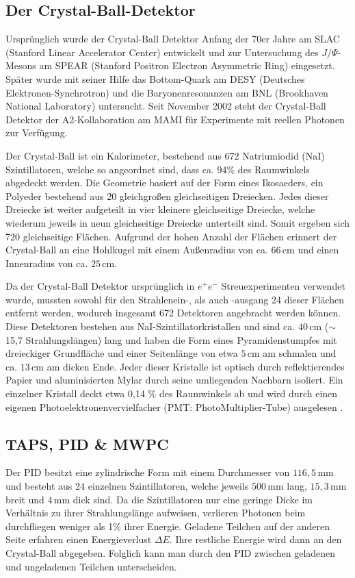 \documentclass[a4paper,11pt,oneside,final,german,openbib,pdftex]{scrbook}
\begin{document}
{\subsection{Der Crystal-Ball-Detektor}
Ursprünglich wurde der Crystal-Ball Detektor Anfang der 70er Jahre am SLAC (Stanford Linear Accelerator Center) entwickelt und zur Untersuchung des $J/\Psi$-Mesons am SPEAR (Stanford Positron Electron Asymmetric Ring) eingesetzt. Später wurde mit seiner Hilfe das Bottom-Quark am DESY (Deutsches Elektronen-Synchrotron) und die Baryonenresonanzen am BNL (Brookhaven National Laboratory) untersucht.
Seit November 2002 steht der Crystal-Ball Detektor der A2-Kollaboration am MAMI für Experimente mit reellen Photonen zur Verfügung.
\newline

Der Crystal-Ball ist ein Kalorimeter, bestehend aus 672 Natriumiodid (NaI) Szintillatoren, welche so angeordnet sind, dass ca. 94\% des Raumwinkels abgedeckt werden. Die Geometrie basiert auf der Form eines Ikosaeders, ein Polyeder bestehend aus 20 gleichgro{\ss}en gleichseitigen Dreiecken. Jedes dieser Dreiecke ist weiter aufgeteilt in vier kleinere gleichseitige Dreiecke, welche wiederum jeweils in neun gleichseitige Dreiecke unterteilt sind. Somit ergeben sich 720 gleichseitige Fl\"achen. Aufgrund der hohen Anzahl der Fl\"achen erinnert der Crystal-Ball an eine Hohlkugel mit einem Au{\ss}enradius von ca. $66\,\text{cm}$ und einen Innenradius von ca. $25\,\text{cm}$. 

Da der Crystal-Ball Detektor urspr\"unglich in $e^+e^-$ Streuexperimenten verwendet wurde, mussten sowohl f\"ur den Strahlenein-, als auch -ausgang 24 dieser Fl\"achen entfernt werden, wodurch insgesamt 672 Detektoren angebracht werden k\"onnen. Diese Detektoren bestehen aus NaI-Szintillatorkristallen und sind ca. $40\,\text{cm}$ ($\sim$15,7 Strahlungsl\"angen) lang und haben die Form eines Pyramidenstumpfes mit dreieckiger Grundfl\"ache und einer Seitenl\"ange von etwa $5\,\text{cm}$ am schmalen und ca. $13\,\text{cm}$ am dicken Ende. Jeder dieser Kristalle ist optisch durch reflektierendes Papier und aluminisierten Mylar durch seine umliegenden Nachbarn isoliert. Ein einzelner Kristall deckt etwa 0,14 \% des Raumwinkels ab und wird durch einen eigenen Photoelektronenvervielfacher (PMT: PhotoMultiplier-Tube) ausgelesen \cite{We13}. 



\subsection{TAPS, PID \& MWPC}
\label{sec:TAPS-PID-MWPC}
Der PID besitzt eine zylindrische Form mit einem Durchmesser von $116,5\,\text{mm}$ und besteht aus 24 einzelnen Szintillatoren, welche jeweils $500 \,\text{mm}$ lang, $15,3\,\text{mm}$ breit und $4 \,\text{mm}$ dick sind. Da die Szintillatoren nur eine geringe Dicke im Verhältnis zu ihrer Strahlungslänge aufweisen, verlieren Photonen beim durchfliegen weniger als 1\% ihrer Energie. Geladene Teilchen auf der anderen Seite erfahren einen Energieverlust $\Delta E$. Ihre restliche Energie wird dann an den Crystal-Ball abgegeben. Folglich kann man durch den PID zwischen geladenen und ungeladenen Teilchen unterscheiden. 

}
\end{document}
